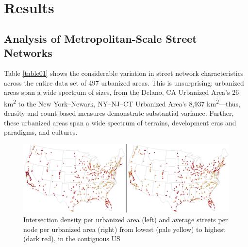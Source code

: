 \documentclass{article}
\begin{document}
\section{Results}

\subsection{Analysis of Metropolitan-Scale Street Networks}

Table \ref{table01} shows the considerable variation in street network characteristics across the entire data set of 497 urbanized areas. This is unsurprising: urbanized areas span a wide spectrum of sizes, from the Delano, CA Urbanized Area's 26 km\textsuperscript{2} to the New York--Newark, NY--NJ--CT Urbanized Area's 8,937 km\textsuperscript{2}---thus, density and count-based measures demonstrate substantial variance. Further, these urbanized areas span a wide spectrum of terrains, development eras and paradigms, and cultures.

\begin{figure}
\includegraphics[width=1\textwidth]{media/fig01.png}
\caption{Intersection density per urbanized area (left) and average streets per node per urbanized area (right) from lowest (pale yellow) to highest (dark red), in the contiguous US}
\label{fig01}
\end{figure}
\end{document}
